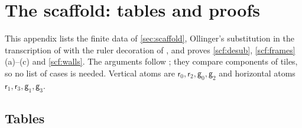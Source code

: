\section{The scaffold: tables and proofs}\label{app:scaffold}

This appendix lists the finite data of \cref{sec:scaffold}, Ollinger's substitution \cite{Ollinger08} in the transcription of \cite{LeanWang} with the ruler decoration of \cite{DM26forget}, and proves \cref{scf:desub}, \cref{scf:frames}(a)--(c) and \cref{scf:walls}. The arguments follow \cite{DM26forget}; they compare components of tiles, so no list of cases is needed. Vertical atoms are $\mathsf r_0,\mathsf r_2,\mathsf g_0,\mathsf g_2$ and horizontal atoms $\mathsf r_1,\mathsf r_3,\mathsf g_1,\mathsf g_3$.

\subsection{Tables}

